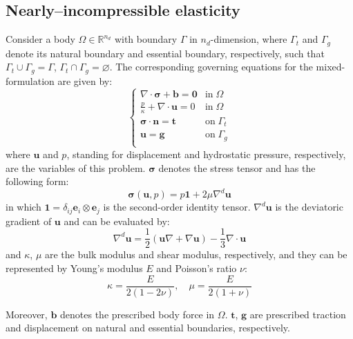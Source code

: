 \subsection{Nearly--incompressible elasticity}
Consider a body $\Omega \in \mathbb{R}^{n_d}$ with boundary $\Gamma$ in $n_d$-dimension, where $\Gamma_t$ and $\Gamma_g$ denote its natural boundary and essential boundary, respectively, such that $\Gamma_t \cup \Gamma_g = \Gamma$, $\Gamma_t \cap \Gamma_g = \varnothing$. The corresponding governing equations for the mixed-formulation are given by:
\begin{equation}\label{strong}
\begin{cases}
\nabla \cdot \boldsymbol{\sigma} + \boldsymbol{b} = \boldsymbol{0} & \mathrm{in} \; \Omega \\
\frac{p}{\kappa} + \nabla \cdot \boldsymbol{u} = 0 & \mathrm{in} \; \Omega \\
\boldsymbol{\sigma} \cdot \boldsymbol{n} = \boldsymbol{t} & \mathrm{on} \; \Gamma_t \\
\boldsymbol{u} = \boldsymbol{g} & \mathrm{on} \; \Gamma_g \\
\end{cases}
\end{equation}
where $\boldsymbol{u}$ and $p$, standing for displacement and hydrostatic pressure, respectively, are the variables of this problem. $\boldsymbol{\sigma}$ denotes the stress tensor and has the following form:
\begin{equation}\label{stress}
\boldsymbol{\sigma}(\boldsymbol{u}, p) = p \boldsymbol{1} + 2\mu \nabla^d \boldsymbol{u}
\end{equation}
in which $\boldsymbol{1} = \delta_{ij} \boldsymbol{e}_i \otimes \boldsymbol{e}_j$ is the second-order identity tensor. $\nabla^d \boldsymbol{u}$ is the deviatoric gradient of $\boldsymbol{u}$ and can be evaluated by:
\begin{equation}
\nabla^d \boldsymbol{u} = \frac{1}{2}(\boldsymbol{u} \nabla + \nabla \boldsymbol{u}) - \frac{1}{3} \nabla \cdot \boldsymbol{u}
\end{equation}
and $\kappa$, $\mu$ are the bulk modulus and shear modulus, respectively, and they can be represented by Young's modulus $E$ and Poisson's ratio $\nu$:
\begin{equation}\label{modulus}
\kappa = \frac{E}{2(1-2\nu)}, \quad \mu = \frac{E}{2(1+\nu)}
\end{equation}

Moreover, $\boldsymbol{b}$ denotes the prescribed body force in $\Omega$. $\boldsymbol{t}$, $\boldsymbol{g}$ are prescribed traction and displacement on natural and essential boundaries, respectively.

